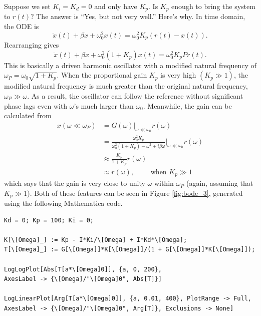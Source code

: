 \documentclass{article}
\theoremstyle{definition}
\newcommand{\f}[2]{\frac{#1}{#2}}
\begin{document}
Suppose we set $K_i = K_d = 0$ and only have $K_p$. Is $K_p$ enough to bring the system to $r(t)$? The answer is ``Yes, but not very well.'' Here's why. In time domain, the ODE is 
\begin{equation*}
\ddot{x}(t) + \beta \dot{x} + \omega_0^2 x(t) = \omega_0^2 K_p (r(t) - x(t)). 
\end{equation*} 
Rearranging gives
\begin{equation*}
\ddot{x}(t) + \beta \dot{x} + \omega_0^2 (1+K_p) x(t) = \omega_0^2 K_p P r(t). 
\end{equation*}
This is basically a driven harmonic oscillator with a modified natural frequency of $\omega_P = \omega_0 \sqrt{1+K_p}$. When the proportional gain $K_p$ is very high $(K_p \gg 1)$, the modified natural frequency is much greater than the original natural frequency, $\omega_P \gg \omega$. As a result, the oscillator can follow the reference without significant phase lags even with $\omega$'s much larger than $\omega_0$. Meanwhile, the gain can be calculated from  
\begin{align*}
x(\omega\ll \omega_P) 
&= G(\omega)\bigg\vert_{\omega \ll \omega_0} r(\omega)\\
&= \f{\omega_0^2 K_p}{\omega_0^2(1+K_p)-\omega^2 + i\beta \omega}\bigg\vert_{\omega\ll \omega_0} r(\omega) \\
&\approx \f{K_p}{1+K_p} r(\omega) \\
&\approx r(\omega),\quad\quad \text{ when } K_p \gg 1
\end{align*}
which says that the gain is very close to unity $\omega$ within $\omega_P$ (again, assuming that $K_p\gg 1$). Both of these features can be seen in Figure \ref{fig:bode_3}, generated using the following Mathematica code.
\begin{lstlisting}
Kd = 0; Kp = 100; Ki = 0;

K[\[Omega]_] := Kp - I*Ki/\[Omega] + I*Kd*\[Omega]; 
T[\[Omega]_] := G[\[Omega]]*K[\[Omega]]/(1 + G[\[Omega]]*K[\[Omega]]);

LogLogPlot[Abs[T[a*\[Omega]0]], {a, 0, 200}, 
AxesLabel -> {\[Omega]/"\[Omega]0", Abs[T]}]

LogLinearPlot[Arg[T[a*\[Omega]0]], {a, 0.01, 400}, PlotRange -> Full, 
AxesLabel -> {\[Omega]/"\[Omega]0", Arg[T]}, Exclusions -> None]
\end{lstlisting}
\end{document}
